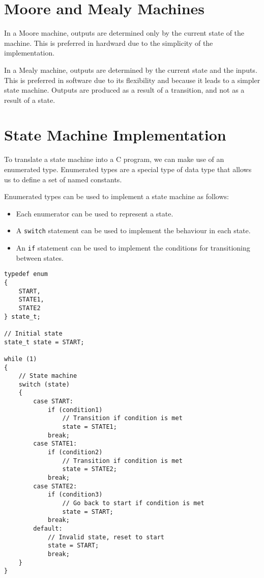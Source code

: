 \documentclass[a4paper]{report}
\begin{document}
\section{Moore and Mealy Machines}
In a Moore machine, outputs are determined only by the current state of
the machine. This is preferred in hardward due to the simplicity of the
implementation.

In a Mealy machine, outputs are determined by the current state and the
inputs. This is preferred in software due to its flexibility and
because it leads to a simpler state machine. Outputs are produced as a
result of a transition, and not as a result of a state.
\section{State Machine Implementation}
To translate a state machine into a C program, we can make use of an
enumerated type. Enumerated types are a special type of data type that
allows us to define a set of named constants.

Enumerated types can be used to implement a state machine as follows:
\begin{itemize}
    \item Each enumerator can be used to represent a state.
    \item A \texttt{switch} statement can be used to implement
          the behaviour in each state.
    \item An \texttt{if} statement can be used to implement the
          conditions for transitioning between states.
\end{itemize}
\begin{verbatim}
typedef enum
{
    START,
    STATE1,
    STATE2
} state_t;

// Initial state
state_t state = START;

while (1)
{
    // State machine
    switch (state)
    {
        case START:
            if (condition1)
                // Transition if condition is met
                state = STATE1;
            break;
        case STATE1:
            if (condition2)
                // Transition if condition is met
                state = STATE2;
            break;
        case STATE2:
            if (condition3)
                // Go back to start if condition is met
                state = START;
            break;
        default:
            // Invalid state, reset to start
            state = START;
            break;
    }
}
\end{verbatim}
\end{document}
